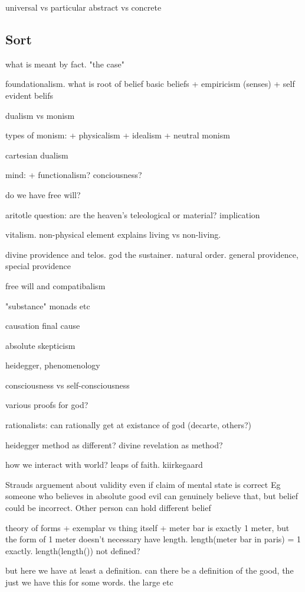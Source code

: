 universal vs particular
abstract vs concrete
\subsection{Sort}
what is meant by fact. "the case"

foundationalism.
what is root of belief
basic beliefs
+ empiricism (senses)
+ self evident belifs


dualism vs monism

types of monism:
+ physicalism
+ idealism
+ neutral monism

cartesian dualism

mind:
+ functionalism? conciousness?

do we have free will?


aritotle question: are the heaven's teleological or material? implication

vitalism. non-physical element explains living vs non-living.

divine providence and telos. god the sustainer. natural order.
general providence, special providence

free will and compatibalism

"substance" monads etc


causation
final cause

absolute skepticism

heidegger, phenomenology

consciousness vs self-consciousness

various proofs for god?

rationalists: can rationally get at existance of god (decarte, others?)

heidegger method as different?
divine revelation as method?

how we interact with world? leaps of faith. kiirkegaard





Strauds arguement about validity even if claim of mental state is correct
Eg someone who believes in absolute good evil can genuinely believe that, but belief could be incorrect. Other person can hold different belief


theory of forms
+ exemplar vs thing itself
+ meter bar is exactly 1 meter, but the form of 1 meter doesn't necessary have length.
length(meter bar in paris) = 1 exactly.
length(length()) not defined?

but here we have at least a definition.
can there be a definition of the good, the just
we have this for some words. the large etc

